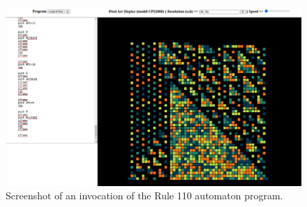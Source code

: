 \documentclass[11pt,a4paper]{scrartcl}
\begin{document}
\begin{figure}
  \centering
  \includegraphics[width=\textwidth]{rule110}
  \caption{Screenshot of an invocation of the Rule 110 automaton program.}\label{fig:rule110}
\end{figure}

\newpage



\end{document}
